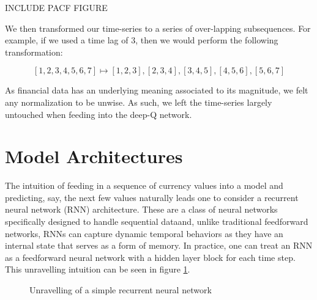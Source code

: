 \documentclass{article}
\begin{document}
INCLUDE PACF FIGURE

We then transformed our time-series to a series of over-lapping subsequences. For example, if we used a time lag of $ 3 $, then we would perform the following transformation:

\[
  [1,2,3,4,5,6,7] \mapsto [1,2,3], [2,3,4], [3,4,5], [4,5,6], [5,6,7]
\]

As financial data has an underlying meaning associated to its magnitude, we felt any normalization to be unwise. As such, we left the time-series largely untouched when feeding into the deep-Q network.


\section{Model Architectures}

The intuition of feeding in a sequence of currency values into a model and predicting, say, the next few values naturally leads one to consider a recurrent neural network (RNN) architecture. These are a class of neural networks specifically designed to handle sequential dataand, unlike traditional feedforward networks, RNNs can capture dynamic temporal behaviors as they have an internal state that serves as a form of memory. In practice, one can treat an RNN as a feedforward neural network with a hidden layer block for each time step. This unravelling intuition can be seen in figure \ref{fig:unravel}.

\begin{figure}[H]
  \centering
\caption{Unravelling of a simple recurrent neural network}
\label{fig:unravel}
\end{figure}
\end{document}
